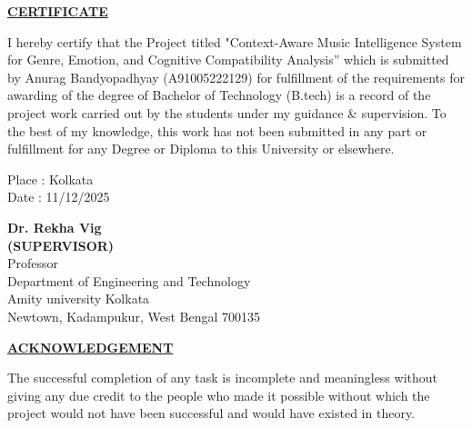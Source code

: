 \documentclass[12pt,a4paper]{report}
\begin{document}
\vspace{2cm}
\begin{center}
 \textbf{\underline {CERTIFICATE}}
\end{center}
I hereby certify that the Project titled "Context-Aware Music Intelligence System for Genre, Emotion, and Cognitive Compatibility Analysis” which is submitted by Anurag Bandyopadhyay (A91005222129) for fulfillment of the requirements for awarding of the degree of Bachelor of Technology (B.tech) is a record of the project work carried out by the students under my guidance \& supervision. To the best of my knowledge, this work has not been submitted in any part or fulfillment for any Degree or Diploma to this University or elsewhere.

\noindent \begin{minipage}{4cm}
\begin{flushleft}
\vspace{1 cm}
                         
Place : Kolkata \\
Date : 11/12/2025 \\

\end{flushleft} 
\end{minipage}
\hfill
\begin{minipage}{10cm}
\begin{flushright}                                      
\vspace{2cm}
                         

\vspace{.8cm}
\textbf{Dr. Rekha Vig}\\
\textbf{(SUPERVISOR)}\\
Professor\\
Department of Engineering and Technology \\
Amity university Kolkata \\
Newtown, Kadampukur, West Bengal 700135\\
\end{flushright} 
\end{minipage}

\newpage
\begin{center}
 \textbf{\underline {ACKNOWLEDGEMENT}}
\end{center}

The successful completion of any task is incomplete and meaningless without giving any due credit to the people who made it possible without which the project would not have been successful and would have existed in theory.
\end{document}
